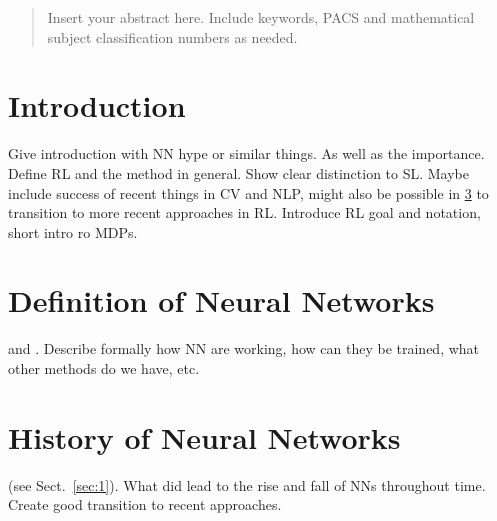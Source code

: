 
    \date{Received: date / Accepted: date}


    \maketitle

    \begin{abstract}
        Insert your abstract here. Include keywords, PACS and mathematical
        subject classification numbers as needed.
    \end{abstract}

    \section{Introduction}
    \label{sec:intro}
    Give introduction with NN hype or similar things. As well as the importance.
    Define RL and the method in general.
    Show clear distinction to SL.
    Maybe include success of recent things in CV and NLP, might also be possible in \ref{sec:history} to transition to more recent approaches in RL. 
    Introduce RL goal and notation, short intro ro MDPs.
    \section{Definition of Neural Networks}
    \label{sec:def}
    \cite{RefB} and \cite{RefJ}.
    Describe formally how NN are working, how can they be trained, what other methods do we have, etc.
    \section{History of Neural Networks}
    \label{sec:history}
    (see Sect.~\ref{sec:1}).
    What did lead to the rise and fall of NNs throughout time.
    Create good transition to recent approaches.


